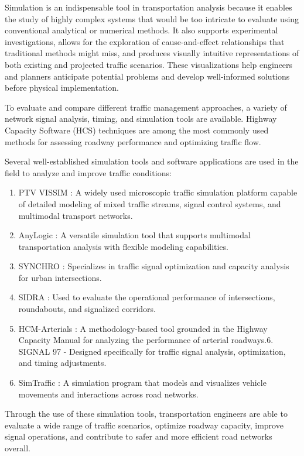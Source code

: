 Simulation is an indispensable tool in transportation analysis because it enables the study of highly complex systems that would be too intricate to evaluate using conventional analytical or numerical methods. It also supports experimental investigations, allows for the exploration of cause-and-effect relationships that traditional methods might miss, and produces visually intuitive representations of both existing and projected traffic scenarios. These visualizations help engineers and planners anticipate potential problems and develop well-informed solutions before physical implementation.

To evaluate and compare different traffic management approaches, a variety of network signal analysis, timing, and simulation tools are available. Highway Capacity Software (HCS) techniques are among the most commonly used methods for assessing roadway performance and optimizing traffic flow.

Several well-established simulation tools and software applications are used in the field to analyze and improve traffic conditions:

\begin{enumerate}
    \item PTV VISSIM : A widely used microscopic traffic simulation platform capable of detailed modeling of mixed traffic streams, signal control systems, and multimodal transport networks.
    \item AnyLogic : A versatile simulation tool that supports multimodal transportation analysis with flexible modeling capabilities.
    \item SYNCHRO : Specializes in traffic signal optimization and capacity analysis for urban intersections.
    \item SIDRA : Used to evaluate the operational performance of intersections, roundabouts, and signalized corridors.
    \item HCM-Arterials : A methodology-based tool grounded in the Highway Capacity Manual for analyzing the performance of arterial roadways.6.	SIGNAL 97 - Designed specifically for traffic signal analysis, optimization, and timing adjustments.
    \item SimTraffic : A simulation program that models and visualizes vehicle movements and interactions across road networks.
\end{enumerate}

Through the use of these simulation tools, transportation 
engineers are able to evaluate a wide range of traffic 
scenarios, optimize roadway capacity, improve signal 
operations, and contribute to safer and more efficient road 
networks overall.


